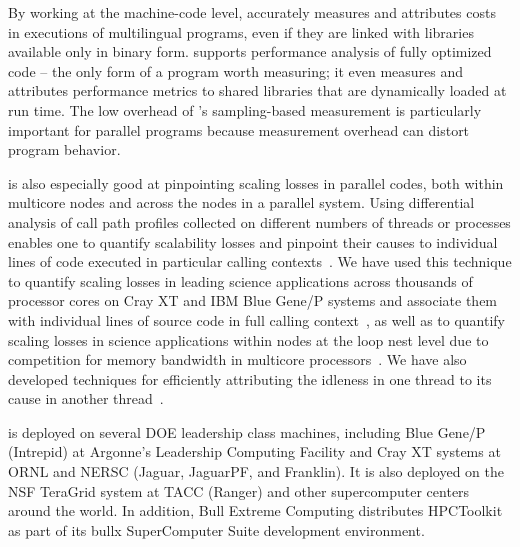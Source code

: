 \documentclass[11pt,letterpaper]{report}
\begin{document}
By working at the machine-code level, \HPCToolkit{} accurately measures and attributes costs in executions of multilingual programs, even if they are linked with libraries available only in binary form.
\HPCToolkit{} supports performance analysis of fully optimized code -- the only form of a program worth measuring; it even measures and attributes performance metrics to shared libraries that are dynamically loaded at run time.
The low overhead of \HPCToolkit{}'s sampling-based measurement is particularly important for parallel programs because measurement overhead can distort program behavior.

\HPCToolkit{} is also especially good at pinpointing scaling losses in parallel codes, both within multicore nodes and across the nodes in a parallel system.
Using differential analysis of call path profiles collected on different numbers of threads or processes enables one to quantify scalability losses and pinpoint their causes to individual lines of code executed in particular calling contexts~\cite{Coarfa-MC:2007:ICS-scalability}.
We have used this technique to quantify scaling losses in leading science applications across thousands of processor cores on Cray XT and IBM Blue Gene/P systems and associate them with individual lines of source code in full calling context~\cite{Tallent-MC-etal:2009:SC-hpctoolkit-petascale,Tallent-MC-etal:2010:SC-hpctoolkit-load-imbalance}, as well as to quantify scaling losses in science applications within nodes at the loop nest level due to competition for memory bandwidth in multicore processors~\cite{Tallent-etal:2008:SciDAC-hpctoolkit}.
We have also developed techniques for efficiently attributing the idleness in one thread to its cause in another thread~\cite{Tallent-MC:2009:PPoPP-hpctoolkit-work-stealing,Tallent-MC-Porterfield:2010:PPoPP-hpctoolkit-lock-contention}.

\HPCToolkit{} is deployed on several DOE leadership class machines, including Blue Gene/P (Intrepid) at Argonne's Leadership Computing Facility and Cray XT systems at ORNL and NERSC (Jaguar, JaguarPF, and Franklin).
It is also deployed on the NSF TeraGrid system at TACC (Ranger) and other supercomputer centers around the world.  In addition, Bull Extreme Computing distributes HPCToolkit as part of its bullx  SuperComputer Suite development environment. 


\end{document}
